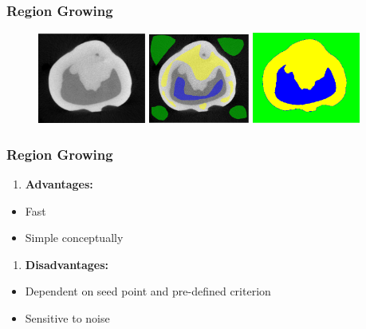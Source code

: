 \documentclass[notheorems,mathserif,table,compress]{beamer}  %
\begin{document}
\begin{frame}
\frametitle{Region Growing}
\begin{figure}[!ht]
  \begin{minipage}[t]{0.3\textwidth}
  \centering
  \includegraphics[width=1.4in]{seed1.png}
  \end{minipage}
  \begin{minipage}[t]{0.3\textwidth}
  \centering
  \includegraphics[width=1.3in]{seed2.png}
  \end{minipage}  
  \begin{minipage}[t]{0.3\textwidth}
  \centering
  \includegraphics[width=1.4in]{seed3.png}
  \end{minipage}  
\end{figure} 
\end{frame}

\begin{frame}
    \frametitle{Region Growing}
    \begin{enumerate}[{\color{black}{\Large (C)}}]
    \item  \textbf{\Large Advantages:}
    \end{enumerate}
        \begin{itemize}
        \item Fast
        \item Simple conceptually
        \end{itemize}
    \begin{enumerate}[]
    \item  \hspace{0.25in}\textbf{\Large Disadvantages:}
    \end{enumerate}
        \begin{itemize}
        \item Dependent on seed point and pre-defined criterion
        \item Sensitive to noise
    \end{itemize}
\end{frame}
\end{document}
